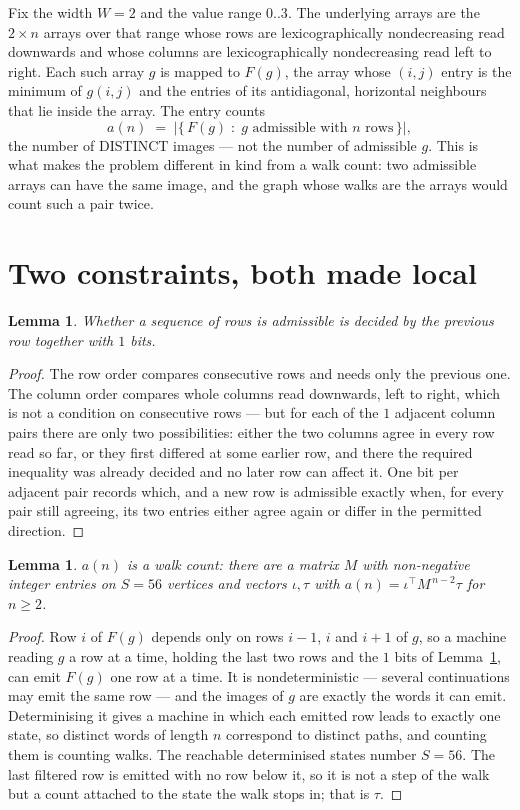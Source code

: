 \documentclass[11pt,a4paper]{article}
\theoremstyle{plain}
\newtheorem{lemma}[theorem]{Lemma}
\theoremstyle{definition}
\begin{document}
Fix the width $W=2$ and the value range $0..3$. The underlying arrays are the
$2\times n$ arrays over that range whose rows are lexicographically nondecreasing read downwards
and whose columns are lexicographically nondecreasing read left to right. Each such array $g$
is mapped to $F(g)$, the array whose $(i,j)$ entry is the minimum of $g(i,j)$ and the entries
of its antidiagonal, horizontal neighbours that lie inside the array. The entry counts
\[
a(n)\;=\;\bigl|\{\,F(g)\;:\;g\text{ admissible with }n\text{ rows}\,\}\bigr|,
\]
the number of DISTINCT images --- not the number of admissible $g$. This is what makes the
problem different in kind from a walk count: two admissible arrays can have the same image, and
the graph whose walks are the arrays would count such a pair twice.

\section{Two constraints, both made local}

\begin{lemma}\label{lem:local}
Whether a sequence of rows is admissible is decided by the previous row together with
$1$ bits.
\end{lemma}

\begin{proof}
The row order compares consecutive rows and needs only the previous one. The column order
compares whole columns read downwards, left to right, which is not a condition on consecutive
rows --- but for each of the $1$ adjacent column pairs there are only two possibilities:
either the two columns agree in every row read so far, or they first differed at some earlier
row, and there the required inequality was already decided and no later row can affect it. One
bit per adjacent pair records which, and a new row is admissible exactly when, for every pair
still agreeing, its two entries either agree again or differ in the permitted direction.
\end{proof}

\begin{lemma}\label{lem:det}
$a(n)$ is a walk count: there are a matrix $M$ with non-negative integer entries on $S=56$
vertices and vectors $\iota,\tau$ with $a(n)=\iota^{\!\top}M^{\,n-2}\tau$ for $n\ge2$.
\end{lemma}

\begin{proof}
Row $i$ of $F(g)$ depends only on rows $i-1$, $i$ and $i+1$ of $g$, so a machine reading $g$ a
row at a time, holding the last two rows and the $1$ bits of Lemma~\ref{lem:local}, can
emit $F(g)$ one row at a time. It is nondeterministic --- several continuations may emit the
same row --- and the images of $g$ are exactly the words it can emit. Determinising it gives a
machine in which each emitted row leads to exactly one state, so distinct words of length $n$
correspond to distinct paths, and counting them is counting walks. The reachable determinised
states number $S=56$. The last filtered row is emitted with no row below it, so it is not a
step of the walk but a count attached to the state the walk stops in; that is $\tau$.
\end{proof}
\end{document}
